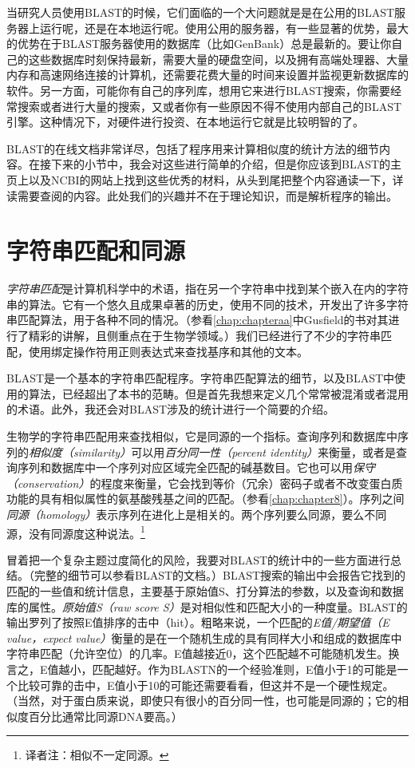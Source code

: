当研究人员使用BLAST的时候，它们面临的一个大问题就是是在公用的BLAST服务器上运行呢，还是在本地运行呢。使用公用的服务器，有一些显著的优势，最大的优势在于BLAST服务器使用的数据库（比如GenBank）总是最新的。要让你自己的这些数据库时刻保持最新，需要大量的硬盘空间，以及拥有高端处理器、大量内存和高速网络连接的计算机，还需要花费大量的时间来设置并监视更新数据库的软件。另一方面，可能你有自己的序列库，想用它来进行BLAST搜索，你需要经常搜索或者进行大量的搜索，又或者你有一些原因不得不使用内部自己的BLAST引擎。这种情况下，对硬件进行投资、在本地运行它就是比较明智的了。

BLAST的在线文档非常详尽，包括了程序用来计算相似度的统计方法的细节内容。在接下来的小节中，我会对这些进行简单的介绍，但是你应该到BLAST的主页上以及NCBI的网站上找到这些优秀的材料，从头到尾把整个内容通读一下，详读需要查阅的内容。此处我们的兴趣并不在于理论知识，而是解析程序的输出。

\section{字符串匹配和同源}
\textit{字符串匹配}是计算机科学中的术语，指在另一个字符串中找到某个嵌入在内的字符串的算法。它有一个悠久且成果卓著的历史，使用不同的技术，开发出了许多字符串匹配算法，用于各种不同的情况。（参看\autoref{chap:chapteraa}中Gusfield的书对其进行了精彩的讲解，且侧重点在于生物学领域。）我们已经进行了不少的字符串匹配，使用绑定操作符用正则表达式来查找基序和其他的文本。

BLAST是一个基本的字符串匹配程序。字符串匹配算法的细节，以及BLAST中使用的算法，已经超出了本书的范畴。但是首先我想来定义几个常常被混淆或者混用的术语。此外，我还会对BLAST涉及的统计进行一个简要的介绍。

生物学的字符串匹配用来查找相似，它是同源的一个指标。查询序列和数据库中序列的\textit{相似度（similarity）}可以用\textit{百分同一性（percent identity）}来衡量，或者是查询序列和数据库中一个序列对应区域完全匹配的碱基数目。它也可以用\textit{保守（conservation）}的程度来衡量，它会找到等价（冗余）密码子或者不改变蛋白质功能的具有相似属性的氨基酸残基之间的匹配。（参看\autoref{chap:chapter8}）。序列之间\textit{同源（homology）}表示序列在进化上是相关的。两个序列要么同源，要么不同源，没有同源度这种说法。\footnote{译者注：相似不一定同源。}

冒着把一个复杂主题过度简化的风险，我要对BLAST的统计中的一些方面进行总结。（完整的细节可以参看BLAST的文档。）BLAST搜索的输出中会报告它找到的匹配的一些值和统计信息，主要基于原始值S、打分算法的参数，以及查询和数据库的属性。\textit{原始值S（raw score S）}是对相似性和匹配大小的一种度量。BLAST的输出罗列了按照E值排序的击中（hit）。粗略来说，一个匹配的\textit{E值/期望值（E value，expect value）}衡量的是在一个随机生成的具有同样大小和组成的数据库中字符串匹配（允许空位）的几率。E值越接近0，这个匹配越不可能随机发生。换言之，E值越小，匹配越好。作为BLASTN的一个经验准则，E值小于1的可能是一个比较可靠的击中，E值小于10的可能还需要看看，但这并不是一个硬性规定。（当然，对于蛋白质来说，即使只有很小的百分同一性，也可能是同源的；它的相似度百分比通常比同源DNA要高。）

